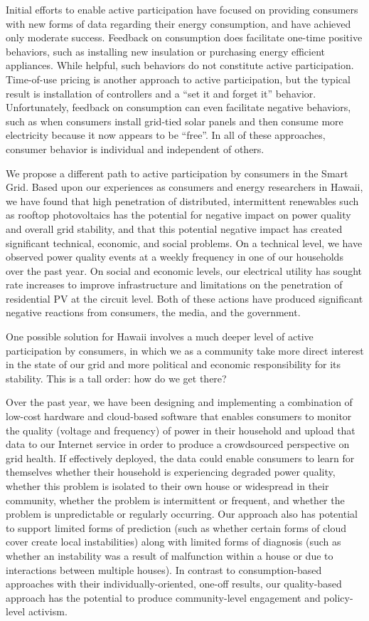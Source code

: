 Initial efforts to enable active participation have focused on providing consumers with new forms of data regarding their energy consumption, and have achieved only moderate success.  Feedback on consumption does facilitate one-time positive behaviors, such as installing new insulation or purchasing energy efficient appliances. While helpful, such behaviors do not constitute active participation.    Time-of-use pricing is another approach to active participation, but the typical result is installation of controllers and a ``set it and forget it'' behavior.  Unfortunately, feedback on consumption can even facilitate negative behaviors, such as when consumers install grid-tied solar panels and then consume more electricity because it now appears to be ``free''.  In all of these approaches, consumer behavior is individual and independent of others. 

We propose a different path to active participation by consumers in the Smart Grid.  Based upon our experiences as consumers and energy researchers in Hawaii, we have found that high penetration of distributed, intermittent renewables such as rooftop photovoltaics has the potential for negative impact on power quality and overall grid stability, and that this potential negative impact has created significant technical, economic, and social problems.  On a technical level, we have observed power quality events at a weekly frequency in one of our households over the past year. On social and economic levels, our electrical utility has sought rate increases to improve infrastructure and limitations on the penetration of residential PV at the circuit level. Both of these actions have produced significant negative reactions from consumers, the media, and the government. 

One possible solution for Hawaii involves a much deeper level of active participation by consumers, in which we as a community take more direct interest in the state of our grid and more political and economic responsibility for its stability.  This is a tall order: how do we get there?

Over the past year, we have been designing and implementing a combination of low-cost hardware and cloud-based software that enables consumers to monitor the quality (voltage and frequency) of power in their household and upload that data to our Internet service in order to produce a crowdsourced perspective on grid health.  If effectively deployed, the data could enable consumers to learn for themselves whether their household is experiencing degraded power quality, whether this problem is isolated to their own house or widespread in their community, whether the problem is intermittent or frequent, and whether the problem is unpredictable or regularly occurring. Our approach also has potential to support limited forms of prediction (such as whether certain forms of cloud cover create local instabilities) along with limited forms of diagnosis (such as whether an instability was a result of malfunction within a house or due to interactions between multiple houses).   In contrast to consumption-based approaches with their individually-oriented, one-off results, our quality-based approach has the potential to produce community-level engagement and policy-level activism.  

